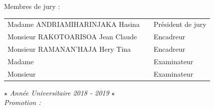 \documentclass[12pt,a4paper]{report}
\begin{document}
\begin{titlepage}
{\begin{center}
 			\vspace*{0.5 cm}
 			\large{Membres de jury :}\\
 			\vspace{0.3 cm}
 			\begin{tabular}{lll}
 				\normalsize Madame ANDRIAMIHARINJAKA Hasina  & & \normalsize Président de jury\\
 				\normalsize Monsieur  RAKOTOARISOA Jean Claude & & \normalsize Encadreur\\
 				\normalsize Monsieur RAMANAN'HAJA Hery Tina & & \normalsize Encadreur\\
 				\normalsize Madame  & & \normalsize Examinateur\\
 				\normalsize Monsieur  & & \normalsize Examinateur\\			
 			\end{tabular}
 		\end{center}
 	}
 	
 	\parbox{\textwidth}{
 		\begin{center}
 			$\star$
 			\centering\textit{Année Universitaire 2018 - 2019} $\star$ \\
 			\centering\textit{Promotion : }
 		\end{center}
 	}
 \end{titlepage}

\restoregeometry 
\end{document}
